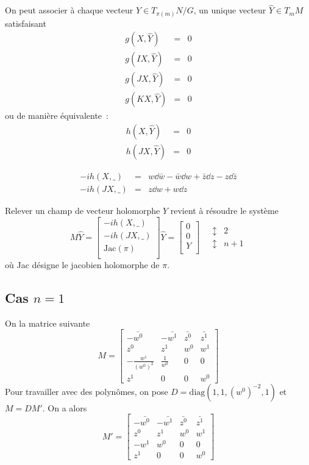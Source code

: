 \documentclass[a4paper,10pt]{article}
\begin{document}
On peut associer à chaque vecteur $Y \in T_{\pi(m)}N/G$, un unique vecteur $\hat{Y} \in T_mM$ satisfaisant
\begin{eqnarray*}
g(X,\hat{Y}) & =& 0\\
g(IX,\hat{Y}) & =& 0\\
g(JX,\hat{Y}) & =& 0\\
g(KX,\hat{Y}) & =& 0
\end{eqnarray*}
ou de manière équivalente~:
\begin{eqnarray*}
h(X,\hat{Y}) & =& 0\\
h(JX,\hat{Y}) & =& 0
\end{eqnarray*}


\begin{eqnarray*}
-ih(X,\_) &=& w \dd \bar{w} - \bar{w} \dd w + \bar{z} \dd z - z \dd \bar{z}\\
-ih(JX,\_) &=& z \dd w + w \dd z
\end{eqnarray*}

Relever un champ de vecteur holomorphe $Y$ revient à résoudre le système 
\[
M \hat{Y} =
\begin{bmatrix}
-ih(X,\_) \\ 
-ih(JX,\_)  \\[1em]
\text{Jac}(\pi)\\[0.8em]

\end{bmatrix} 
 \hat{Y}= 
\begin{bmatrix}
0 \\ 
0 \\[1em]
Y \\[0.8em]
\end{bmatrix} 
\quad	
\begin{array}{cl}
\updownarrow & 2  \\[1.3em]
\updownarrow & n+1
\end{array} 
\]
où Jac désigne le jacobien holomorphe de $\pi$.

\subsection{Cas $n=1$}
On la matrice	 suivante
\[
M = \begin{bmatrix}
-\bar{w^0} & -\bar{w^1} & \bar{z^0} & \bar{z^1} \\ 
z^0 & z^1 & w^0 & w^1 \\ 
-\frac{w^1}{(w^0)^2} & \frac{1}{w^0} & 0 & 0  \\ 
 z^1& 0 & 0 & w^0 
\end{bmatrix} 
\]
Pour travailler avec des polynômes, on pose $D = \text{diag}(1,1,(w^0)^{-2},1)$ et $M = DM'$. On a alors
\[
M' = \begin{bmatrix}
-\bar{w^0} & -\bar{w^1} & \bar{z^0} & \bar{z^1} \\ 
z^0 & z^1 & w^0 & w^1 \\ 
-w^1 & w^0 & 0 & 0  \\ 
 z^1& 0 & 0 & w^0 
\end{bmatrix} 
\]
\end{document}
